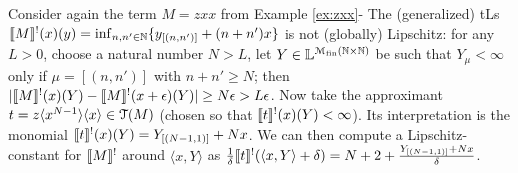 \begin{example}
Consider again the term $M=zxx$ from Example \ref{ex:zxx}-
%
 The (generalized) tLs $\llbracket M\rrbracket^{!}(x)(y)= \inf_{n,n'\in \mathbb N}\{y_{[(n,n')]}+(n+n')x\}$ is not (globally) Lipschitz: for any 
$L>0$, choose a natural number $N>L$, let $Y\in \mathbb{L}^{\mathcal M_{\mathrm{fin}}(\mathbb N\times \mathbb N)}$ be such that $Y_{\mu}<\infty$ only if $\mu=[(n,n')]$ with $n+n'\geq N$; then $|\llbracket M\rrbracket^{!}(x)(Y)- \llbracket M\rrbracket^{!}(x+\epsilon)(Y)|\geq N\epsilon > L\epsilon$. 
Now take the approximant $t= z \langle x^{N-1}\rangle \langle x\rangle \in \mathcal{T}(M)$ (chosen so that $\llbracket t\rrbracket^{!}(x)(Y)<\infty$). Its interpretation is the monomial 
$\llbracket t\rrbracket^{!}(x)(Y) = Y_{[(N-1,1)]}+Nx$. We can then compute a Lipschitz-constant for $\llbracket M\rrbracket^{!}$ around $\langle x,Y\rangle$
as $\frac{1}{\delta}\llbracket t\rrbracket^{!}(\langle x,Y\rangle+\delta)= N+2 + \frac{Y_{[(N-1,1)]}+Nx}{\delta}$. 
\end{example}
%    
%
%

